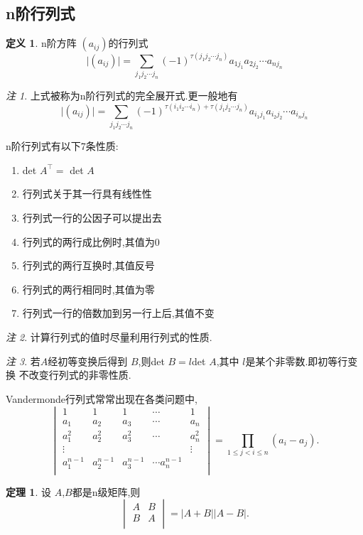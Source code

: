 \documentclass[a4paper,11pt]{article}%
\theoremstyle{remark}
\newtheorem*{remark}{注}
\theoremstyle{definition}
\newtheorem{theorem}{定理}[section]
\theoremstyle{definition}
\newtheorem*{definition}{定义}
\theoremstyle{plain}
\newcommand*{\abs}[1]{\lvert #1 \rvert}
\begin{document}
\subsection{n阶行列式}
\begin{definition}
    n阶方阵 $(a_{ij})$的行列式 
    $$\lvert (a_{ij}) \rvert=\sum_{j_1j_2\cdots j_n}{(-1)^{\tau(j_1j_2\cdots j_n)}a_{1j_1}a_{2j_2}\cdots a_{nj_n}}$$
\end{definition}
\begin{remark}
    上式被称为n阶行列式的完全展开式.更一般地有
    $$\lvert (a_{ij}) \rvert=\sum_{j_1j_2\cdots j_n}{(-1)^{\tau(i_1i_2\cdots i_n)+\tau(j_1j_2\cdots j_n)}a_{i_1j_1}a_{i_2j_2}\cdots a_{i_nj_n}}$$
\end{remark}
n阶行列式有以下7条性质:
\begin{enumerate}
    \item det $A^{\top}=$ det $A$
    \item 行列式关于其一行具有线性性
    \item 行列式一行的公因子可以提出去
    \item 行列式的两行成比例时,其值为0
    \item 行列式的两行互换时,其值反号
    \item 行列式的两行相同时,其值为零
    \item 行列式一行的倍数加到另一行上后,其值不变
\end{enumerate}
\begin{remark}
    计算行列式的值时尽量利用行列式的性质.
\end{remark}
\begin{remark}
    若$A$经初等变换后得到 $B$,则det $B=l$det $A$,其中 $l$是某个非零数.即初等行变换
    不改变行列式的非零性质.
\end{remark}
Vandermonde行列式常常出现在各类问题中,
\begin{equation*}
    \begin{vmatrix}
        1 & 1 & 1 & \cdots & 1 \\
        a_1 & a_2 & a_3 & \cdots & a_n \\
        a_1^2 & a_2^2 & a_3^2 & \cdots & a_n^2 \\
        \vdots &      &       &        &  \vdots \\
        a_1^{n-1} & a_2^{n-1} & a_3^{n-1} & \cdots a_n^{n-1}\\
    \end{vmatrix}
    = \prod _{1\leq j < i\leq n}(a_i-a_j).
\end{equation*}
\begin{theorem}
    设 $A$,$B$都是n级矩阵,则
    \[\begin{vmatrix}
        A&B\\
        B&A\\
    \end{vmatrix}=\abs{A+B}\abs{A-B}.\]
\end{theorem}
\end{document}
